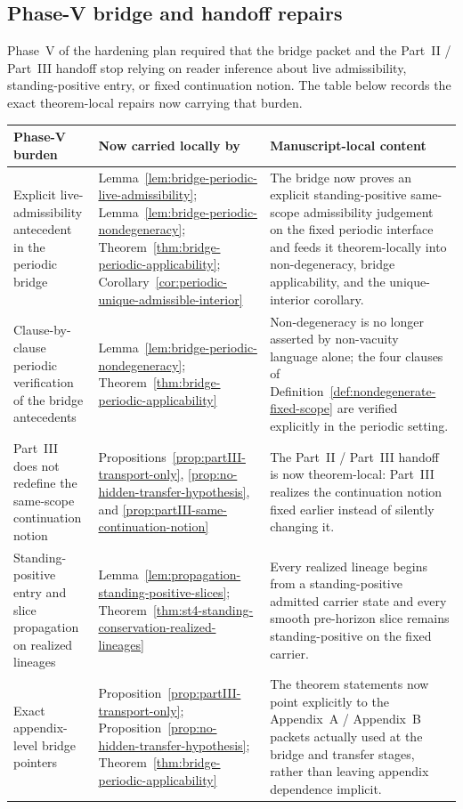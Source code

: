 \subsection*{Phase-V bridge and handoff repairs}
Phase~V of the hardening plan required that the bridge packet and the Part~II / Part~III handoff stop relying on reader inference about live admissibility, standing-positive entry, or fixed continuation notion. The table below records the exact theorem-local repairs now carrying that burden.

\begin{center}
\footnotesize
\renewcommand{\arraystretch}{1.16}
\setlength{\tabcolsep}{4pt}
\begin{tabularx}{0.98\textwidth}{@{}L{0.31\textwidth}L{0.24\textwidth}Y@{}}
\toprule
\textbf{Phase-V burden} & \textbf{Now carried locally by} & \textbf{Manuscript-local content}\\
\midrule
Explicit live-admissibility antecedent in the periodic bridge & Lemma~\ref{lem:bridge-periodic-live-admissibility}; Lemma~\ref{lem:bridge-periodic-nondegeneracy}; Theorem~\ref{thm:bridge-periodic-applicability}; Corollary~\ref{cor:periodic-unique-admissible-interior} & The bridge now proves an explicit standing-positive same-scope admissibility judgement on the fixed periodic interface and feeds it theorem-locally into non-degeneracy, bridge applicability, and the unique-interior corollary.\\
Clause-by-clause periodic verification of the bridge antecedents & Lemma~\ref{lem:bridge-periodic-nondegeneracy}; Theorem~\ref{thm:bridge-periodic-applicability} & Non-degeneracy is no longer asserted by non-vacuity language alone; the four clauses of Definition~\ref{def:nondegenerate-fixed-scope} are verified explicitly in the periodic setting.\\
Part~III does not redefine the same-scope continuation notion & Propositions~\ref{prop:partIII-transport-only}, \ref{prop:no-hidden-transfer-hypothesis}, and \ref{prop:partIII-same-continuation-notion} & The Part~II / Part~III handoff is now theorem-local: Part~III realizes the continuation notion fixed earlier instead of silently changing it.\\
Standing-positive entry and slice propagation on realized lineages & Lemma~\ref{lem:propagation-standing-positive-slices}; Theorem~\ref{thm:st4-standing-conservation-realized-lineages} & Every realized lineage begins from a standing-positive admitted carrier state and every smooth pre-horizon slice remains standing-positive on the fixed carrier.\\
Exact appendix-level bridge pointers & Proposition~\ref{prop:partIII-transport-only}; Proposition~\ref{prop:no-hidden-transfer-hypothesis}; Theorem~\ref{thm:bridge-periodic-applicability} & The theorem statements now point explicitly to the Appendix~A / Appendix~B packets actually used at the bridge and transfer stages, rather than leaving appendix dependence implicit.\\
\bottomrule
\end{tabularx}
\end{center}

